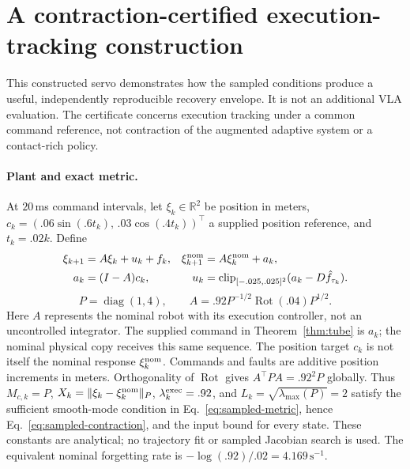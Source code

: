 \section{A contraction-certified execution-tracking construction}
\label{app:contraction-example}
This constructed servo demonstrates how the sampled conditions produce a
useful, independently reproducible recovery envelope. It is not an additional
VLA evaluation. The certificate concerns execution tracking under a common
command reference, not contraction of the augmented adaptive system or a
contact-rich policy.

\paragraph{Plant and exact metric.}
At $20$\,ms command intervals, let $\xi_k\in\mathbb R^2$ be position in meters,
$c_k=(.06\sin(.6t_k),\,.03\cos(.4t_k))^\top$ a supplied position reference,
and $t_k=.02k$. Define
\begin{equation}
\begin{aligned}
\xi_{k+1}&=A\xi_k+u_k+f_k,&
\xi_{k+1}^{\rm nom}&=A\xi_{k}^{\rm nom}+a_k,\\
a_k&=(I-A)c_k,&
u_k&=\operatorname{clip}_{[-.025,.025]^2}
       (a_k-D\hat f_{\tau_k}).
\end{aligned}
\label{eq:construction-plant}
\end{equation}
\begin{equation}
P=\operatorname{diag}(1,4),\qquad
A=.92P^{-1/2}\operatorname{Rot}(.04)P^{1/2}.
\label{eq:construction-metric}
\end{equation}
Here $A$ represents the nominal robot with its execution controller, not an
uncontrolled integrator. The supplied command in Theorem~\ref{thm:tube} is
$a_k$; the nominal physical copy receives this
same sequence. The position target $c_k$ is not itself the nominal response
$\xi_{k}^{\rm nom}$. Commands and faults are additive position increments in meters.
Orthogonality of $\operatorname{Rot}$ gives $A^\top PA=.92^2P$ globally.
Thus $M_{c,k}=P$, $X_k=\|\xi_k-\xi_{k}^{\rm nom}\|_P$,
$\lambda_k^{\rm exec}=.92$, and $L_k=\sqrt{\lambda_{\max}(P)}=2$ satisfy
the sufficient smooth-mode condition in Eq.~\eqref{eq:sampled-metric}, hence
Eq.~\eqref{eq:sampled-contraction}, and the input bound for every state.
These constants are analytical; no trajectory fit or sampled Jacobian search
is used. The equivalent nominal forgetting rate is
$-\log(.92)/.02=4.169\,\mathrm{s}^{-1}$.

